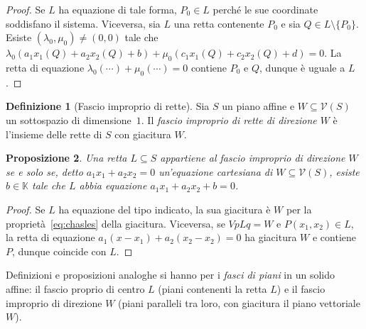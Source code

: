 \documentclass[11pt, a4paper]{book}
\theoremstyle{definition}
\newtheorem{definizione}{Definizione}[section]
\theoremstyle{plain}
\newtheorem{proposizione}[definizione]{Proposizione}
\theoremstyle{remark}
\newcommand{\K}{\mathbb{K}}
\newcommand{\VV}{\mathcal{V}}   %
\begin{document}
\begin{proof}
Se $L$ ha equazione di tale forma, $P_0 \in L$ perché le sue coordinate soddisfano il sistema. Viceversa, sia $L$ una retta contenente $P_0$ e sia $Q \in L \setminus \{P_0\}$. Esiste $(\lambda_0, \mu_0) \neq (0,0)$ tale che $\lambda_0(a_1 x_1(Q) + a_2 x_2(Q) + b) + \mu_0(c_1 x_1(Q) + c_2 x_2(Q) + d) = 0$. La retta di equazione $\lambda_0(\cdots) + \mu_0(\cdots) = 0$ contiene $P_0$ e $Q$, dunque è uguale a $L$.
\end{proof}

\begin{defbox}
\begin{definizione}[Fascio improprio di rette]
Sia $S$ un piano affine e $W \subseteq \VV(S)$ un sottospazio di dimensione~$1$. Il \emph{fascio improprio di rette di direzione $W$} è l'insieme delle rette di $S$ con giacitura $W$.
\end{definizione}
\end{defbox}

\begin{proposizione}
Una retta $L \subseteq S$ appartiene al fascio improprio di direzione $W$ se e solo se, detto $a_1 x_1 + a_2 x_2 = 0$ un'equazione cartesiana di $W \subseteq \VV(S)$, esiste $b \in \K$ tale che $L$ abbia equazione $a_1 x_1 + a_2 x_2 + b = 0$.
\end{proposizione}

\begin{proof}
Se $L$ ha equazione del tipo indicato, la sua giacitura è $W$ per la proprietà~\eqref{eq:chasles} della giacitura. Viceversa, se $VpLq = W$ e $P(x_1, x_2) \in L$, la retta di equazione $a_1(x - x_1) + a_2(x_2 - x_2) = 0$ ha giacitura $W$ e contiene $P$, dunque coincide con $L$.
\end{proof}

Definizioni e proposizioni analoghe si hanno per i \emph{fasci di piani} in un solido affine: il fascio proprio di centro $L$ (piani contenenti la retta $L$) e il fascio improprio di direzione $W$ (piani paralleli tra loro, con giacitura il piano vettoriale $W$).
\end{document}
